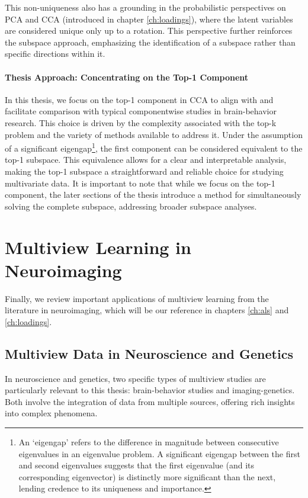 This non-uniqueness also has a grounding in the probabilistic perspectives on PCA and CCA (introduced in chapter \ref{ch:loadings}), where the latent variables are considered unique only up to a rotation.
This perspective further reinforces the subspace approach, emphasizing the identification of a subspace rather than specific directions within it.

\paragraph{Thesis Approach: Concentrating on the Top-1 Component}

In this thesis, we focus on the top-1 component in CCA to align with and facilitate comparison with typical componentwise studies in brain-behavior research.
This choice is driven by the complexity associated with the top-k problem and the variety of methods available to address it.
Under the assumption of a significant eigengap\footnote{An `eigengap' refers to the difference in magnitude between consecutive eigenvalues in an eigenvalue problem. A significant eigengap between the first and second eigenvalues suggests that the first eigenvalue (and its corresponding eigenvector) is distinctly more significant than the next, lending credence to its uniqueness and importance.}, the first component can be considered equivalent to the top-1 subspace.
This equivalence allows for a clear and interpretable analysis, making the top-1 subspace a straightforward and reliable choice for studying multivariate data.
It is important to note that while we focus on the top-1 component, the later sections of the thesis introduce a method for simultaneously solving the complete subspace, addressing broader subspace analyses.


\section{Multiview Learning in Neuroimaging}

Finally, we review important applications of multiview learning from the literature in neuroimaging, which will be our reference in chapters \ref{ch:als} and \ref{ch:loadings}.

\subsection{Multiview Data in Neuroscience and Genetics}

In neuroscience and genetics, two specific types of multiview studies are particularly relevant to this thesis: brain-behavior studies and imaging-genetics.
Both involve the integration of data from multiple sources, offering rich insights into complex phenomena.

